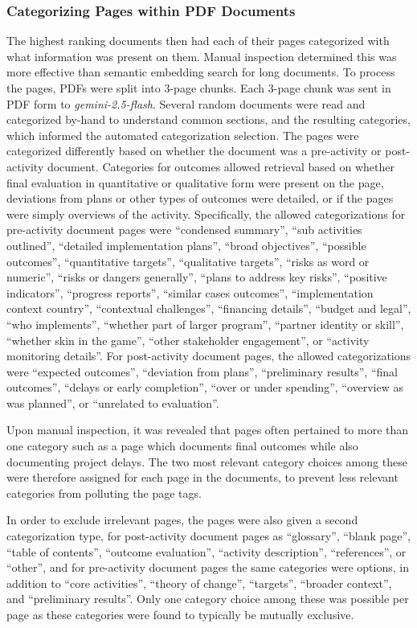 \subsubsection{Categorizing Pages within PDF Documents}
The highest ranking documents then had each of their pages categorized with what information was present on them. Manual inspection determined this was more effective than semantic embedding search for long documents. To process the pages, PDFs were split into 3-page chunks. Each 3-page chunk was sent in PDF form to \emph{gemini-2.5-flash}. Several random documents were read and categorized by-hand to understand common sections, and the resulting categories, which informed the automated categorization selection. The pages were categorized differently based on whether the document was a pre-activity or post-activity document. Categories for outcomes allowed retrieval based on whether final evaluation in quantitative or qualitative form were present on the page, deviations from plans or other types of outcomes were detailed, or if the pages were simply overviews of the activity. Specifically, the allowed categorizations for pre-activity document pages were ``condensed summary'', ``sub activities outlined'', ``detailed implementation plans'', ``broad objectives'', ``possible outcomes'', ``quantitative targets'', ``qualitative targets'', ``risks as word or numeric'', ``risks or dangers generally'', ``plans to address key risks'', ``positive indicators'', ``progress reports'', ``similar cases outcomes'', ``implementation context country'', ``contextual challenges'', ``financing details'', ``budget and legal'', ``who implements'', ``whether part of larger program'', ``partner identity or skill'', ``whether skin in the game'', ``other stakeholder engagement'', or ``activity monitoring details''. For post-activity document pages, the allowed categorizations were ``expected outcomes'', ``deviation from plans'', ``preliminary results'', ``final outcomes'', ``delays or early completion'', ``over or under spending'', ``overview as was planned'', or ``unrelated to evaluation''.

Upon manual inspection, it was revealed that pages often pertained to more than one category such as a page which documents final outcomes while also documenting project delays. The two most relevant category choices among these were therefore assigned for each page in the documents, to prevent less relevant categories from polluting the page tags.

In order to exclude irrelevant pages, the pages were also given a second categorization type, for post-activity document pages as ``glossary'', ``blank page'', ``table of contents'', ``outcome evaluation'', ``activity description'', ``references'', or ``other'', and for pre-activity document pages the same categories were options, in addition to ``core activities'', ``theory of change'', ``targets'', ``broader context'', and ``preliminary results''. Only one category choice among these was possible per page as these categories were found to typically be mutually exclusive.


